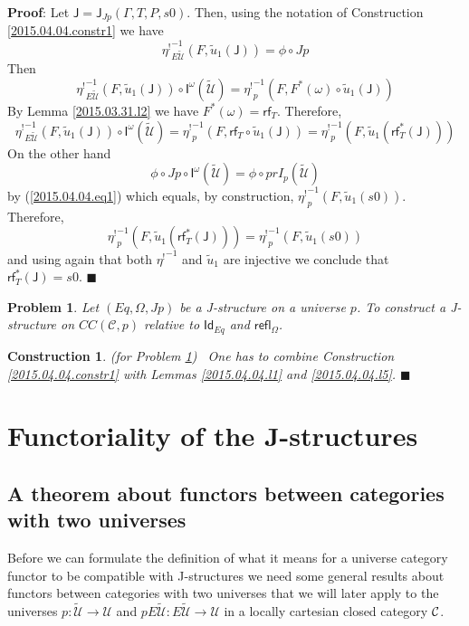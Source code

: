 \documentclass[12pt]{article}
\numberwithin{equation}{section}
\newenvironment{myproof}{{\bf Proof}:}{$\blacksquare$ \vskip 5mm }
\newtheorem{problem}[proposition]{Problem}
\newtheorem{construction0}[proposition]{Construction}
\newenvironment{construction}[1]{\begin{construction0}(for Problem \ref{#1})\ }{$\blacksquare$ \end{construction0}}
\newcommand{\llabel}[1]{\label{#1}}
\newcommand{\sr}{\rightarrow}
\newcommand{\wt}{\widetilde}
\newcommand{\toCC}{CC} %
\newcommand{\C}{{\mathcal C}}  %
\newcommand{\Id}{\mathsf{Id}} %
\newcommand{\refl}{\mathsf{refl}}
\newcommand{\J}{\mathsf{J}}
\newcommand{\U}{\mathcal{U}}
\newcommand{\I}{\mathsf{I}}
\newcommand{\rf}{\mathsf{rf}}
\newcommand{\etashriek}{\eta^!}
\newcommand{\etaunshriek}{{\etashriek}^{-1}}
\begin{document}
%
\begin{myproof}
Let $\J=\J_{Jp}(\Gamma,T,P,s0)$. Then, using the notation of Construction
\ref{2015.04.04.constr1} we have
%
$$\etaunshriek_{E\wt{\U}}(F,\wt{u}_1(\J))=\phi\circ Jp$$
%
Then
%
$$\etaunshriek_{E\wt{\U}}(F,\wt{u}_1(\J))\circ
\I^{\omega}(\wt{\U})=\etaunshriek_p(F,F^*(\omega)\circ \wt{u}_1(\J))$$
%
By Lemma \ref{2015.03.31.l2} we have $F^*(\omega)=\rf_T$. Therefore,
%
$$\etaunshriek_{E\wt{\U}}(F,\wt{u}_1(\J))\circ \I^{\omega}(\wt{\U})=\etaunshriek_p(F,\rf_T\circ
\wt{u}_1(\J))=\etaunshriek_p(F,\wt{u}_1(\rf_T^*(\J)))$$
%
On the other hand
%
$$\phi\circ Jp\circ \I^{\omega}(\wt{\U})=\phi\circ prI_p(\wt{\U})$$
%
by (\ref{2015.04.04.eq1}) which equals, by construction,
$\etaunshriek_p(F,\wt{u}_1(s0))$. Therefore,
%
$$\etaunshriek_p(F,\wt{u}_1(\rf_T^*(\J)))=\etaunshriek_p(F,\wt{u}_1(s0))$$
%
and using again that both $\etaunshriek$ and $\wt{u}_1$ are injective we conclude that
$\rf_T^*(\J)=s0$.
\end{myproof}
%
\begin{problem}
\llabel{2015.04.04.prob2} Let $(Eq,\Omega,Jp)$ be a J-structure on a universe
$p$. To construct a J-structure on $\toCC({\C},p)$ relative to $\Id_{Eq}$
and $\refl_{\Omega}$.
\end{problem} 
%
\begin{construction}{2015.04.04.prob2}\rm
\llabel{2015.04.04.constr2} One has to combine Construction
\ref{2015.04.04.constr1} with Lemmas \ref{2015.04.04.l1} and
\ref{2015.04.04.l5}.
\end{construction}
%





\section{Functoriality of the J-structures}




\subsection{A theorem about functors between categories with two universes}
\llabel{twouniv}
%
Before we can formulate the definition of what it means for a universe category
functor to be compatible with J-structures we need some general results about
functors between categories with two universes that we will later apply to the
universes $p:\wt{\U}\sr \U$ and $pE\wt{\U}:E\wt{\U}\sr \U$ in a locally cartesian
closed category $\cal C$.
\end{document}
